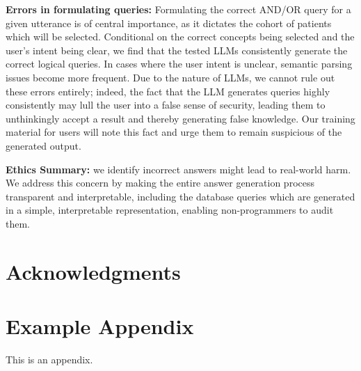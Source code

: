 \documentclass[11pt]{article}
\begin{document}
\textbf{Errors in formulating queries:}
Formulating the correct AND/OR query for a given utterance is of central importance, as it dictates the cohort of patients which will be selected.
Conditional on the correct concepts being selected and the user's intent being clear, we find that the tested LLMs consistently generate the correct logical queries.
In cases where the user intent is unclear, semantic parsing issues become more frequent. Due to the nature of LLMs, we cannot rule out these errors entirely; indeed, the fact that the LLM generates queries highly consistently may lull the user into a false sense of security, leading them to unthinkingly accept a result and thereby generating false knowledge. Our training material for users will note this fact and urge them to remain suspicious of the generated output.

\textbf{Ethics Summary:} we identify incorrect answers might lead to real-world harm. We address this concern by making the entire answer generation process transparent and interpretable, including the database queries which are generated in a simple, interpretable representation, enabling non-programmers to audit them.


\section*{Acknowledgments}



\appendix

\section{Example Appendix}
\label{sec:appendix}

This is an appendix.
\end{document}
